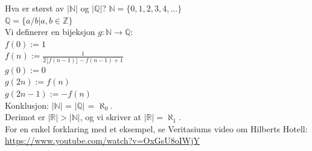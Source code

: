 \begin{frame}{Hva er størst av $|\mathbb{N}|$ og $|\mathbb{Q}|$?}
        $\mathbb{N} = \{0, 1, 2, 3, 4, ...\}$\\
        $\mathbb{Q} = \{a / b | a, b \in \mathbb{Z}\}$\\[2mm]
        \pause
        Vi definerer en bijeksjon $g : \mathbb{N} \rightarrow \mathbb{Q}$:\\
        $f(0) := 1$\\
        $f(n) := \frac{1}{2\lfloor f(n-1) \rfloor - f(n-1)+1}$\\
        $g(0) := 0$\\
        $g(2n) := f(n)$\\
        $g(2n-1) := -f(n)$\\
        Konklusjon: $|\mathbb{N}|$ = $|\mathbb{Q}|$ = $\aleph_0$.\\[2mm]\pause
        Derimot er $|\mathbb{R}| > |\mathbb{N}|$, og vi skriver at $|\mathbb{R}| = \aleph_1$.\\ 
        For en enkel forklaring med et eksempel, se Veritasiums video om Hilberts Hotell: \url{https://www.youtube.com/watch?v=OxGsU8oIWjY}
\end{frame}